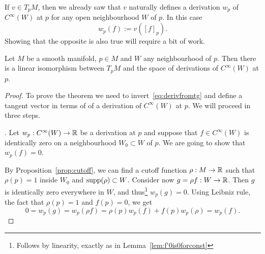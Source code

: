 If $v\in T_p M$, then we already saw that $v$ naturally defines a derivation $w_p$ of $C^\infty(W)$ at $p$ for any open neighbourhood $W$ of $p$.
In this case
\begin{equation}\label{eq:derivfromtg}
  w_p(f) := v([f]_p).
\end{equation}
Showing that the opposite is also true will require a bit of work.

\begin{proposition}
  Let $M$ be a smooth manifold, $p\in M$ and $W$ any neighbourhood of $p$.
  Then there is a linear isomorphism between $T_p M$ and the space of derivations of $C^\infty(W)$ at $p$.
\end{proposition}
\begin{proof}
  To prove the theorem we need to invert~\eqref{eq:derivfromtg} and define a tangent vector in terms of of a derivation of $C^\infty(W)$ at $p$.
  We will proceed in three steps.

  . Let $w_p:C^\infty(W) \to\mathbb{R}$ be a derivation at $p$ and suppose that $f\in C^\infty(W)$ is identically zero on a neighbourhood $W_0\subset W$ of $p$.
  We are going to show that $w_p(f)=0$.

  By Proposition~\ref{prop:cutoff}, we can find a cutoff function $\rho:M\to\mathbb{R}$ such that $\rho(p)=1$ inside $W_0$ and $\operatorname{supp}(\rho) \subset W$. Consider now $g = \rho f : W \to \mathbb{R}$.
  Then $g$ is identically zero everywhere in $W$, and thus\footnote{Follows by linearity, exactly as in Lemma~\ref{lem:f'0is0forconst}} $w_p(g) = 0$.
  Using Leibniz rule, the fact that $\rho(p)=1$ and $f(p) = 0$, we get
  \begin{equation}
    0 = w_p(g) = w_p(\rho f) = \rho(p) w_p(f) + f(p)w_p(\rho) = w_p(f).
  \end{equation}


\end{proof}
